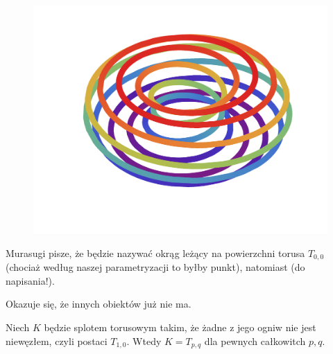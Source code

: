 \begin{figure}[H]
\begin{minipage}[b]{.3\linewidth}
        \centering
        \includegraphics[width=\linewidth]{../data/torus-p11-q2.pdf}
    \end{minipage}
\end{figure}

Murasugi \cite[s. 135]{murasugi1996} pisze, że będzie nazywać okrąg leżący na powierzchni torusa $T_{0, 0}$ (chociaż według naszej parametryzacji to byłby punkt), natomiast (do napisania!).


Okazuje się, że innych obiektów już nie ma.

\begin{proposition}
    Niech $K$ będzie splotem torusowym takim, że żadne z jego ogniw nie jest niewęzłem, czyli postaci $T_{1, 0}$.
    Wtedy $K = T_{p, q}$ dla pewnych całkowitch $p, q$.
\end{proposition}

